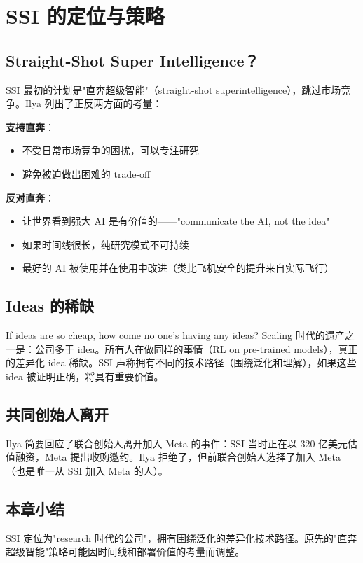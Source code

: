 \section{SSI 的定位与策略}

\subsection{Straight-Shot Super Intelligence？}

SSI 最初的计划是"直奔超级智能"（straight-shot superintelligence），跳过市场竞争。Ilya 列出了正反两方面的考量：

\textbf{支持直奔}：
\begin{itemize}
    \item 不受日常市场竞争的困扰，可以专注研究
    \item 避免被迫做出困难的 trade-off
\end{itemize}

\textbf{反对直奔}：
\begin{itemize}
    \item 让世界看到强大 AI 是有价值的——"communicate the AI, not the idea"
    \item 如果时间线很长，纯研究模式不可持续
    \item 最好的 AI 被使用并在使用中改进（类比飞机安全的提升来自实际飞行）
\end{itemize}

\subsection{Ideas 的稀缺}

\begin{importantbox}{If ideas are so cheap, how come no one's having any ideas?}
Scaling 时代的遗产之一是：公司多于 idea。所有人在做同样的事情（RL on pre-trained models），真正的差异化 idea 稀缺。SSI 声称拥有不同的技术路径（围绕泛化和理解），如果这些 idea 被证明正确，将具有重要价值。
\end{importantbox}

\subsection{共同创始人离开}

Ilya 简要回应了联合创始人离开加入 Meta 的事件：SSI 当时正在以 320 亿美元估值融资，Meta 提出收购邀约。Ilya 拒绝了，但前联合创始人选择了加入 Meta（也是唯一从 SSI 加入 Meta 的人）。

\subsection{本章小结}

SSI 定位为"research 时代的公司"，拥有围绕泛化的差异化技术路径。原先的"直奔超级智能"策略可能因时间线和部署价值的考量而调整。


